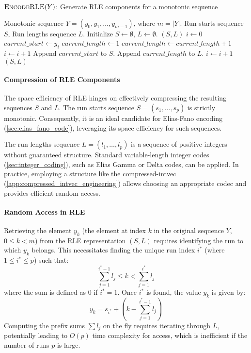 \begin{algorithm}[htbp]
    \caption{$\textsc{EncodeRLE}(Y)$: Generate RLE components for a monotonic sequence}
    \label{alg:rle_encode} %
    \small
    \begin{algorithmic}[1]
        \Require Monotonic sequence $Y = (y_0, y_1, \dots, y_{m-1})$, where $m = |Y|$.
        \Ensure Run starts sequence $S$, Run lengths sequence $L$.
        \State Initialize $S \leftarrow \emptyset$, $L \leftarrow \emptyset$.
        \State \Return $(S, L)$
        \EndIf
        \State $i \leftarrow 0$
        \State $current\_start \leftarrow y_i$
        \State $current\_length \leftarrow 1$
        \State $current\_length \leftarrow current\_length + 1$
        \State $i \leftarrow i + 1$
        \EndWhile
        \State Append $current\_start$ to $S$.
        \State Append $current\_length$ to $L$.
        \State $i \leftarrow i + 1$
        \EndWhile
        \State \Return $(S, L)$
    \end{algorithmic}
\end{algorithm}

\paragraph{Compression of RLE Components}
The space efficiency of RLE hinges on effectively compressing the resulting sequences $S$ and $L$.
The run starts sequence $S = (s_1, \dots, s_p)$ is strictly monotonic. Consequently, it is an ideal candidate for Elias-Fano encoding (\autoref{sec:elias_fano_code}), leveraging its space efficiency for such sequences.

The run lengths sequence $L = (l_1, \dots, l_p)$ is a sequence of positive integers without guaranteed structure. Standard variable-length integer codes (\autoref{sec:integer_coding}), such as Elias Gamma or Delta codes, can be applied. In practice, employing a structure like the \textsf{compressed-intvec} (\autoref{app:compressed_intvec_engineering}) allows choosing an appropriate codec and provides efficient random access.

\paragraph{Random Access in RLE}
Retrieving the element $y_k$ (the element at index $k$ in the original sequence $Y$, $0 \le k < m$) from the RLE representation $(S, L)$ requires identifying the run to which $y_k$ belongs. This necessitates finding the unique run index $i^*$ (where $1 \le i^* \le p$) such that:
\[ \sum_{j=1}^{i^*-1} l_j \le k < \sum_{j=1}^{i^*} l_j \]
where the sum is defined as $0$ if $i^*=1$. Once $i^*$ is found, the value $y_k$ is given by:
\[ y_k = s_{i^*} + \left( k - \sum_{j=1}^{i^*-1} l_j \right) \]
Computing the prefix sums $\sum l_j$ on the fly requires iterating through $L$, potentially leading to $O(p)$ time complexity for access, which is inefficient if the number of runs $p$ is large.

